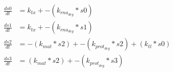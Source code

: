 \documentclass{article}
\begin{document}
\begin{align*}
\frac{ds0}{dt} &= k_{tx} + - (k_{rna}_{deg}*s0) \\
\frac{ds1}{dt} &= k_{tx} + - (k_{rna}_{deg}*s1) \\
\frac{ds2}{dt} &= - (k_{mat}*s2) + - (k_{prot}_{deg}*s2) + (k_{tl}*s0) \\
\frac{ds3}{dt} &= (k_{mat}*s2) + - (k_{prot}_{deg}*s3)
\end{align*}
\end{document}
